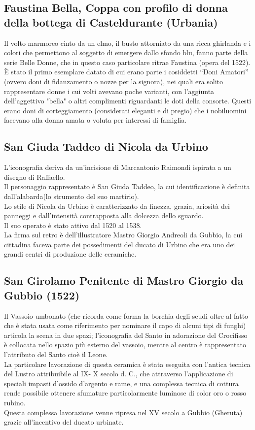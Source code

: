 \documentclass[hidelinks,12pt,a4paper]{article}
\begin{document}
\begin{flushleft}
			\subsection{Faustina Bella, Coppa con profilo di donna della bottega di Casteldurante (Urbania)}
			Il volto marmoreo cinto da un elmo, il busto attorniato da una ricca ghirlanda e i colori che permettono al soggetto di emergere dallo sfondo blu, fanno parte della serie Belle Donne, che in questo caso particolare ritrae Faustina (opera del 1522).\\
			È stato il primo esemplare datato di cui erano parte i cosiddetti “Doni Amatori” (ovvero doni di fidanzamento o nozze per la signora), nei quali era solito rappresentare donne i cui volti avevano poche varianti, con l'aggiunta dell'aggettivo "bella" o altri complimenti riguardanti le doti della consorte. Questi erano doni di corteggiamento (considerati eleganti e di pregio) che i nobiluomini facevano alla donna amata o voluta per interessi di famiglia.
	
			\subsection{San Giuda Taddeo di Nicola da Urbino}
			L'iconografia deriva da un’incisione di Marcantonio Raimondi ispirata a un disegno di Raffaello.\\
			Il personaggio rappresentato è San Giuda Taddeo, la cui identificazione è definita dall'alabarda(lo strumento del suo martirio).\\
			Lo stile di Nicola da Urbino è caratterizzato da finezza, grazia, ariosità dei panneggi e dall'intensità contrapposta alla dolcezza dello sguardo.\\
			Il suo operato è stato attivo dal 1520 al 1538.\\
			La firma sul retro è dell'illustratore Mastro Giorgio Andreoli da Gubbio, la cui cittadina faceva parte dei possedimenti del ducato di Urbino che era uno dei grandi centri di produzione delle ceramiche.
	
			\subsection{San Girolamo Penitente di Mastro Giorgio da Gubbio (1522)}
			Il Vassoio umbonato (che ricorda come forma la borchia degli scudi oltre al fatto che è stata usata come riferimento per nominare il capo di alcuni tipi di funghi) articola la scena in due spazi; l’iconografia del Santo in adorazione del Crocifisso è collocata nello spazio più esterno del vassoio, mentre al centro è rappresentato l’attributo del Santo cioè il Leone. \\
			La particolare lavorazione di questa ceramica è stata eseguita con l’antica tecnica del Lustro attribuibile al IX- X secolo d. C., che attraverso l’applicazione di speciali impasti d'ossido d'argento e rame, e una complessa tecnica di cottura rende possibile ottenere sfumature particolarmente luminose di color oro o rosso rubino.\\
			Questa complessa lavorazione venne ripresa nel XV secolo a Gubbio (Gheruta) grazie all'incentivo del ducato urbinate.
	

\end{flushleft}
\end{document}
